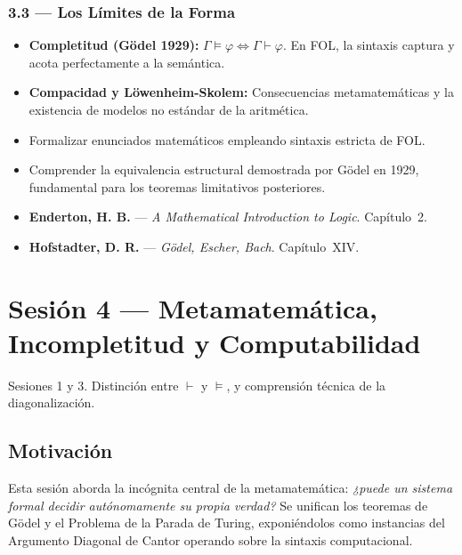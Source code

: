 \documentclass[11pt, letterpaper]{article}
\begin{document}
\subsubsection{3.3 --- Los L\'imites de la Forma}
\begin{itemize}
  \item \textbf{Completitud (G\"odel 1929):} $\Gamma\models\varphi \Leftrightarrow \Gamma\vdash\varphi$. En FOL, la sintaxis captura y acota perfectamente a la sem\'antica.
  \item \textbf{Compacidad y L\"owenheim-Skolem:} Consecuencias metamatem\'aticas y la existencia de modelos no est\'andar de la aritm\'etica.
\end{itemize}

\begin{objetivos}
\begin{itemize}
  \item Formalizar enunciados matem\'aticos empleando sintaxis estricta de FOL.
  \item Comprender la equivalencia estructural demostrada por G\"odel en 1929, fundamental para los teoremas limitativos posteriores.
\end{itemize}
\end{objetivos}

\begin{lecturas}
\begin{itemize}
  \item[$(\star)$] \textbf{Enderton, H. B.} --- \emph{A Mathematical Introduction to Logic}. Cap\'itulo~2.
  \item[$(\star)$] \textbf{Hofstadter, D. R.} --- \emph{G\"odel, Escher, Bach}. Cap\'itulo~XIV.
\end{itemize}
\end{lecturas}

\newpage

\section{Sesi\'on 4 --- Metamatem\'atica, Incompletitud y Computabilidad}

\begin{prereqs}
Sesiones 1 y 3. Distinci\'on entre $\vdash$ y $\models$, y comprensi\'on t\'ecnica de la diagonalizaci\'on.
\end{prereqs}

\subsection*{Motivaci\'on}
Esta sesi\'on aborda la inc\'ognita central de la metamatem\'atica: \emph{¿puede un sistema formal decidir aut\'onomamente su propia verdad?} Se unifican los teoremas de G\"odel y el Problema de la Parada de Turing, exponi\'endolos como instancias del Argumento Diagonal de Cantor operando sobre la sintaxis computacional.
\end{document}
